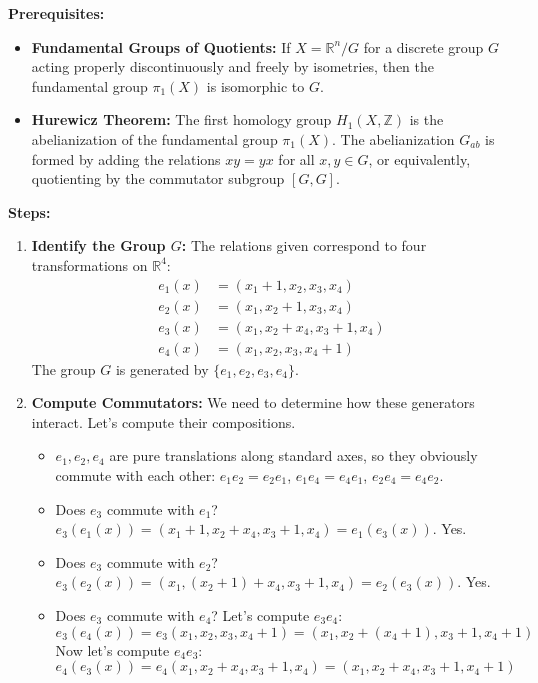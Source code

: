 \begin{solution}
\textbf{Prerequisites:}
\begin{itemize}
    \item \textbf{Fundamental Groups of Quotients:} If $X = \mathbb{R}^n / G$ for a discrete group $G$ acting properly discontinuously and freely by isometries, then the fundamental group $\pi_1(X)$ is isomorphic to $G$.
    \item \textbf{Hurewicz Theorem:} The first homology group $H_1(X, \mathbb{Z})$ is the abelianization of the fundamental group $\pi_1(X)$. The abelianization $G_{ab}$ is formed by adding the relations $xy = yx$ for all $x, y \in G$, or equivalently, quotienting by the commutator subgroup $[G, G]$.
\end{itemize}

\medskip
\textbf{Steps:}
\begin{enumerate}
    \item \textbf{Identify the Group $G$:} The relations given correspond to four transformations on $\mathbb{R}^4$:
    \begin{align*}
        e_1(x) &= (x_1+1, x_2, x_3, x_4) \\
        e_2(x) &= (x_1, x_2+1, x_3, x_4) \\
        e_3(x) &= (x_1, x_2+x_4, x_3+1, x_4) \\
        e_4(x) &= (x_1, x_2, x_3, x_4+1)
    \end{align*}
    The group $G$ is generated by $\{e_1, e_2, e_3, e_4\}$.
    
    \item \textbf{Compute Commutators:} We need to determine how these generators interact. Let's compute their compositions.
    \begin{itemize}
        \item $e_1, e_2, e_4$ are pure translations along standard axes, so they obviously commute with each other: $e_1 e_2 = e_2 e_1$, $e_1 e_4 = e_4 e_1$, $e_2 e_4 = e_4 e_2$.
        \item Does $e_3$ commute with $e_1$? $e_3(e_1(x)) = (x_1+1, x_2+x_4, x_3+1, x_4) = e_1(e_3(x))$. Yes.
        \item Does $e_3$ commute with $e_2$? $e_3(e_2(x)) = (x_1, (x_2+1)+x_4, x_3+1, x_4) = e_2(e_3(x))$. Yes.
        \item Does $e_3$ commute with $e_4$? 
        Let's compute $e_3 e_4$:
        \[
        e_3(e_4(x)) = e_3(x_1, x_2, x_3, x_4+1) = (x_1, x_2+(x_4+1), x_3+1, x_4+1)
        \]
        Now let's compute $e_4 e_3$:
        \[
        e_4(e_3(x)) = e_4(x_1, x_2+x_4, x_3+1, x_4) = (x_1, x_2+x_4, x_3+1, x_4+1)
        \]
    \end{itemize}
    

\end{enumerate}
\end{solution}
